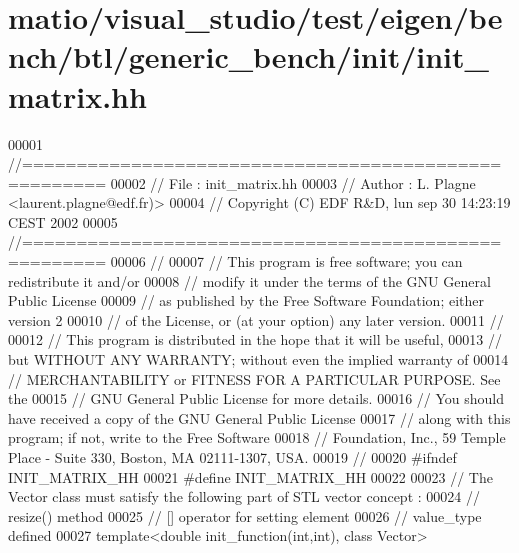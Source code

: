 \hypertarget{matio_2visual__studio_2test_2eigen_2bench_2btl_2generic__bench_2init_2init__matrix_8hh_source}{}\section{matio/visual\+\_\+studio/test/eigen/bench/btl/generic\+\_\+bench/init/init\+\_\+matrix.hh}
\label{matio_2visual__studio_2test_2eigen_2bench_2btl_2generic__bench_2init_2init__matrix_8hh_source}

\begin{DoxyCode}
00001 \textcolor{comment}{//=====================================================}
00002 \textcolor{comment}{// File   :  init\_matrix.hh}
00003 \textcolor{comment}{// Author :  L. Plagne <laurent.plagne@edf.fr)>}
00004 \textcolor{comment}{// Copyright (C) EDF R&D,  lun sep 30 14:23:19 CEST 2002}
00005 \textcolor{comment}{//=====================================================}
00006 \textcolor{comment}{//}
00007 \textcolor{comment}{// This program is free software; you can redistribute it and/or}
00008 \textcolor{comment}{// modify it under the terms of the GNU General Public License}
00009 \textcolor{comment}{// as published by the Free Software Foundation; either version 2}
00010 \textcolor{comment}{// of the License, or (at your option) any later version.}
00011 \textcolor{comment}{//}
00012 \textcolor{comment}{// This program is distributed in the hope that it will be useful,}
00013 \textcolor{comment}{// but WITHOUT ANY WARRANTY; without even the implied warranty of}
00014 \textcolor{comment}{// MERCHANTABILITY or FITNESS FOR A PARTICULAR PURPOSE.  See the}
00015 \textcolor{comment}{// GNU General Public License for more details.}
00016 \textcolor{comment}{// You should have received a copy of the GNU General Public License}
00017 \textcolor{comment}{// along with this program; if not, write to the Free Software}
00018 \textcolor{comment}{// Foundation, Inc., 59 Temple Place - Suite 330, Boston, MA  02111-1307, USA.}
00019 \textcolor{comment}{//}
00020 \textcolor{preprocessor}{#ifndef INIT\_MATRIX\_HH}
00021 \textcolor{preprocessor}{#define INIT\_MATRIX\_HH}
00022 
00023 \textcolor{comment}{// The Vector class must satisfy the following part of STL vector concept :}
00024 \textcolor{comment}{//            resize() method}
00025 \textcolor{comment}{//            [] operator for setting element}
00026 \textcolor{comment}{//            value\_type defined}
00027 \textcolor{keyword}{template}<\textcolor{keywordtype}{double} init\_function(\textcolor{keywordtype}{int},\textcolor{keywordtype}{int}), \textcolor{keyword}{class} Vector>

\end{DoxyCode}
